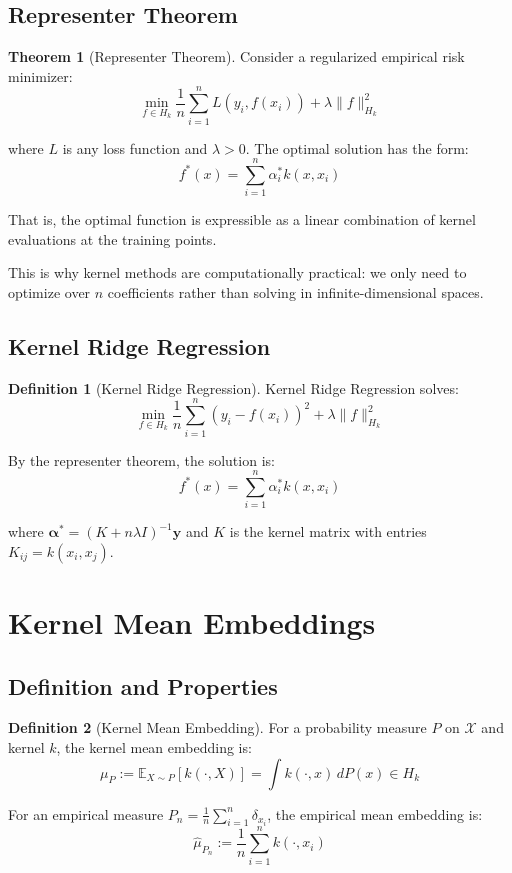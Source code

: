 \documentclass[12pt,a4paper]{article}
\theoremstyle{definition}
\newtheorem{definition}{Definition}[section]
\newtheorem{theorem}{Theorem}[section]
\begin{document}
\subsection{Representer Theorem}

\begin{theorem}[Representer Theorem]
Consider a regularized empirical risk minimizer:
\[
\min_{f \in H_k} \frac{1}{n} \sum_{i=1}^{n} L(y_i, f(x_i)) + \lambda \|f\|_{H_k}^2
\]

where $L$ is any loss function and $\lambda > 0$. The optimal solution has the form:
\[
f^*(x) = \sum_{i=1}^{n} \alpha_i^* k(x, x_i)
\]

That is, the optimal function is expressible as a linear combination of kernel evaluations at the training points.
\end{theorem}

This is why kernel methods are computationally practical: we only need to optimize over $n$ coefficients rather than solving in infinite-dimensional spaces.

\subsection{Kernel Ridge Regression}

\begin{definition}[Kernel Ridge Regression]
Kernel Ridge Regression solves:
\[
\min_{f \in H_k} \frac{1}{n} \sum_{i=1}^{n} (y_i - f(x_i))^2 + \lambda \|f\|_{H_k}^2
\]

By the representer theorem, the solution is:
\[
f^*(x) = \sum_{i=1}^{n} \alpha_i^* k(x, x_i)
\]

where $\boldsymbol{\alpha}^* = (K + n\lambda I)^{-1}\mathbf{y}$ and $K$ is the kernel matrix with entries $K_{ij} = k(x_i, x_j)$.
\end{definition}

\section{Kernel Mean Embeddings}

\subsection{Definition and Properties}

\begin{definition}[Kernel Mean Embedding]
For a probability measure $P$ on $\mathcal{X}$ and kernel $k$, the kernel mean embedding is:
\[
\mu_P := \mathbb{E}_{X \sim P}[k(\cdot, X)] = \int k(\cdot, x) \, dP(x) \in H_k
\]

For an empirical measure $P_n = \frac{1}{n}\sum_{i=1}^{n} \delta_{x_i}$, the empirical mean embedding is:
\[
\hat{\mu}_{P_n} := \frac{1}{n} \sum_{i=1}^{n} k(\cdot, x_i)
\]
\end{definition}
\end{document}
